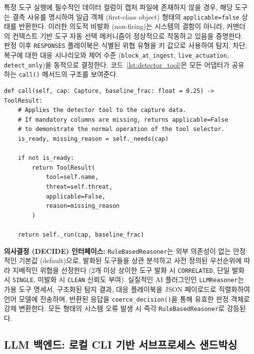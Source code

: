 특정 도구 실행에 필수적인 데이터 컬럼이 캡처 파일에 존재하지 않을 경우, 해당 도구는 결측 사유를 명시하여 일급 객체 (first-class object) 형태의 \texttt{applicable=false} 상태를 반환한다. 이러한 의도적 비발화 (non-firing)는 시스템의 결함이 아니라, 커맨더의 컨텍스트 기반 도구 자동 선택 메커니즘이 정상적으로 작동하고 있음을 증명한다. 판정 이후 \texttt{RESPONSES} 플레이북은 식별된 위협 유형을 키 값으로 사용하여 탐지, 차단, 복구에 대한 대응 시나리오와 제어 수준 (\texttt{block\_at\_ingest}, \texttt{live\_actuation}, \texttt{detect\_only})을 동적으로 결정한다. 코드~\ref{lst:detector_tool}은 모든 어댑터가 공유하는 \texttt{call()} 메서드의 구조를 보여준다.

\begin{lstlisting}[style=custompython, caption={\texttt{blue\_commander.DetectorTool.call} 구현. 결측 컬럼은 일급 \texttt{applicable=false} 속성으로 처리하여 자동 선택기의 논리를 보존한다.}, label={lst:detector_tool}]
def call(self, cap: Capture, baseline_frac: float = 0.25) -> ToolResult:
    # Applies the detector tool to the capture data.
    # If mandatory columns are missing, returns applicable=False 
    # to demonstrate the normal operation of the tool selector.
    is_ready, missing_reason = self._needs(cap)
    
    if not is_ready:
        return ToolResult(
            tool=self.name,
            threat=self.threat,
            applicable=False,
            reason=missing_reason
        )
        
    return self._run(cap, baseline_frac)
\end{lstlisting}

\textbf{의사결정 (DECIDE) 인터페이스:} \texttt{RuleBasedReasoner}는 외부 의존성이 없는 안정적인 기본값 (default)으로, 발화된 도구들을 상관 분석하고 사전 정의된 우선순위에 따라 지배적인 위협을 선정한다 (2개 이상 상이한 도구 발화 시 \texttt{CORRELATED}, 단일 발화 시 \texttt{SINGLE}, 미발화 시 \texttt{CLEAN} 신뢰도 부여). 실질적인 AI 플러그인인 \texttt{LLMReasoner}는 가용 도구 명세서, 구조화된 탐지 결과, 대응 플레이북을 JSON 페이로드로 직렬화하여 언어 모델에 전송하며, 반환된 응답을 \texttt{coerce\_decision()}을 통해 유효한 판정 객체로 강제 변환한다. 모든 형태의 시스템 오류 발생 시 즉각 \texttt{RuleBasedReasoner}로 강등된다.

\subsection{LLM 백엔드: 로컬 CLI 기반 서브프로세스 샌드박싱}

